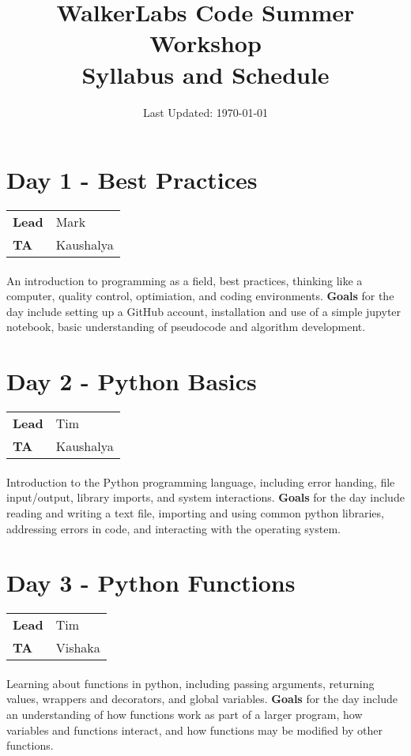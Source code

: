 \documentclass[letterpaper,10pt,oneside]{article}
\title{WalkerLabs Code Summer Workshop \\ {\small Syllabus and Schedule}}
\author{}
\date{Last Updated: \today}
\begin{document}
\maketitle
\section*{Day 1 - Best Practices}
\begin{tabular}{p{1.5cm}l}
    \textbf{Lead} & Mark \\
    \textbf{TA} & Kaushalya \\
\end{tabular}
\paragraph{} An introduction to programming as a field, best practices, thinking like a computer, quality control, optimiation, and coding environments.
\textbf{Goals} for the day include setting up a GitHub account, installation and use of a simple jupyter notebook, basic understanding of pseudocode and algorithm development.

\section*{Day 2 - Python Basics}
\begin{tabular}{p{1.5cm}l}
    \textbf{Lead} & Tim \\
    \textbf{TA} & Kaushalya \\
\end{tabular}
\paragraph{} Introduction to the Python programming language, including error handing, file input/output, library imports, and system interactions. 
\textbf{Goals} for the day include reading and writing a text file, importing and using common python libraries, addressing errors in code, and interacting with the operating system.

\section*{Day 3 - Python Functions}
\begin{tabular}{p{1.5cm}l}
    \textbf{Lead} & Tim \\
    \textbf{TA} & Vishaka \\
\end{tabular}
\paragraph{} Learning about functions in python, including passing arguments, returning values, wrappers and decorators, and global variables.
\textbf{Goals} for the day include an understanding of how functions work as part of a larger program, how variables and functions interact, and how functions may be modified by other functions.
\end{document}
